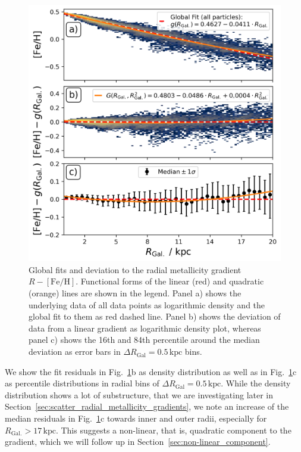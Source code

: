 \documentclass[fleqn,usenatbib]{mnras}
\begin{document}
\begin{figure}
    \centering
    \includegraphics[width=\columnwidth]{figures/global_r_feh_fit.png}
    \caption{Global fits and deviation to the radial metallicity gradient $R-\mathrm{[Fe/H]}$. Functional forms of the linear (red) and quadratic (orange) lines are shown in the legend. Panel a) shows the underlying data of all data points as logarithmic density and the global fit to them as red dashed line. Panel b) shows the deviation of data from a linear gradient as logarithmic density plot, whereas panel c) shows the 16th and 84th percentile around the median deviation as error bars in $\Delta R_\mathrm{Gal} = 0.5\,\mathrm{kpc}$ bins.}
    \label{fig:global_r_feh_fit}
\end{figure}

We show the fit residuals in Fig.~\ref{fig:global_r_feh_fit}b as density distribution as well as in Fig.~\ref{fig:global_r_feh_fit}c as percentile distributions in radial bins of $\Delta R_\mathrm{Gal} = 0.5\,\mathrm{kpc}$. While the density distribution shows a lot of substructure, that we are investigating later in Section~\ref{sec:scatter_radial_metallicity_gradients}, we note an increase of the median residuals in Fig.~\ref{fig:global_r_feh_fit}c towards inner and outer radii, especially for $R_\mathrm{Gal.} > 17\,\mathrm{kpc}$. This suggests a non-linear, that is, quadratic component to the gradient, which we will follow up in Section~\ref{sec:non-linear_component}.
\end{document}

